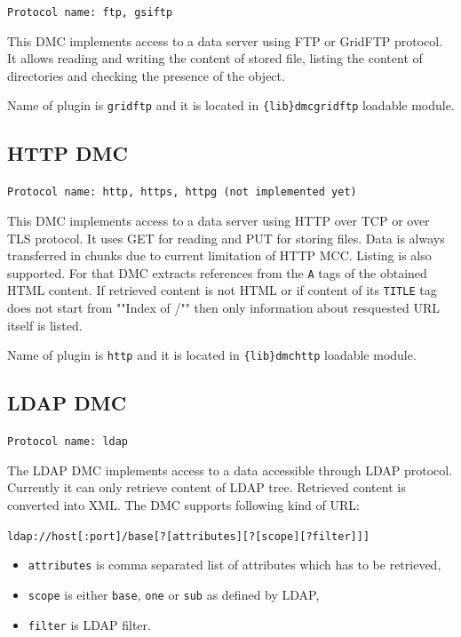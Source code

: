 \documentclass{book}
\begin{document}
\texttt{Protocol name: ftp, gsiftp}

This DMC implements access to a data server using FTP or GridFTP protocol. It allows reading and writing the content of stored file, listing the content of directories and checking the presence of the object.

Name of plugin is \texttt{gridftp} and it is located in \texttt{\{lib\}dmcgridftp} loadable module.


\subsection{HTTP DMC}

\texttt{Protocol name: http, https, httpg (not implemented yet)}

This DMC implements access to a data server using HTTP over TCP or over TLS protocol. It uses GET for reading and PUT for storing files. Data is always transferred in chunks due to current limitation of HTTP MCC. Listing is also supported. For that DMC extracts references from the \texttt{A} tags of the obtained HTML content. If retrieved content is not HTML or if content of its \texttt{TITLE} tag does not start from ""Index of /"" then only information about resquested URL itself is listed.

Name of plugin is \texttt{http} and it is located in \texttt{\{lib\}dmchttp} loadable module.


\subsection{LDAP DMC}

\texttt{Protocol name: ldap}

The LDAP DMC implements access to a data accessible through LDAP protocol. Currently it can only retrieve content of LDAP tree. Retrieved content is converted into XML. The DMC supports following kind of URL:

\texttt{ldap://host[:port]/base[?[attributes][?[scope][?filter]]]}

\begin{itemize}
\item \texttt{attributes} is comma separated list of attributes which has to be retrieved,
\item \texttt{scope} is either \texttt{base}, \texttt{one} or \texttt{sub} as defined by LDAP,
\item \texttt{filter} is LDAP filter.
\end{itemize}
\end{document}
